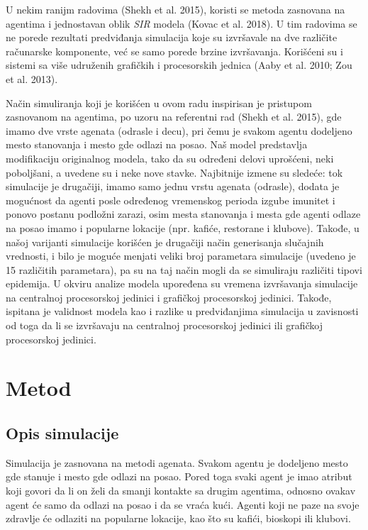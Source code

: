 U nekim ranijm radovima (Shekh et al. 2015), koristi se metoda zasnovana na
agentima i jednostavan oblik \textit{SIR} modela (Kovac et al. 2018). U tim radovima se ne porede
rezultati predviđanja simulacija koje su izvršavale na dve različite računarske
komponente, već se samo porede brzine izvršavanja. Korišćeni su i sistemi sa više
udruženih grafičkih i procesorskih jednica (Aaby et al. 2010; Zou et al. 2013).

Način simuliranja koji je korišćen u ovom radu inspirisan je pristupom
zasnovanom na agentima, po uzoru na referentni rad (Shekh et al. 2015), gde imamo dve
vrste agenata (odrasle i decu), pri čemu je svakom agentu dodeljeno mesto stanovanja i
mesto gde odlazi na posao. Naš model predstavlja modifikaciju originalnog modela,
tako da su određeni delovi uprošćeni, neki poboljšani, a uvedene su i neke nove stavke.
Najbitnije izmene su sledeće: tok simulacije je drugačiji, imamo samo jednu vrstu
agenata (odrasle), dodata je mogućnost da agenti posle određenog vremenskog
perioda izgube imunitet i ponovo postanu podložni zarazi, osim mesta stanovanja i
mesta gde agenti odlaze na posao imamo i popularne lokacije (npr. kafiće, restorane i
klubove). Takođe, u našoj varijanti simulacije korišćen je drugačiji način generisanja
slučajnih vrednosti, i bilo je moguće menjati veliki broj parametara simulacije (uvedeno
je 15 različitih parametara), pa su na taj način mogli da se simuliraju različiti tipovi
epidemija. U okviru analize modela upoređena su vremena izvršavanja simulacije na
centralnoj procesorskoj jedinici i grafičkoj procesorskoj jedinici. Takođe, ispitana je
validnost modela kao i razlike u predviđanjima simulacija u zavisnosti od toga da li se
izvršavaju na centralnoj procesorskoj jedinici ili grafičkoj procesorskoj jedinici.

\section{Metod}

\subsection{Opis simulacije}

Simulacija je zasnovana na metodi agenata. Svakom agentu je dodeljeno mesto
gde stanuje i mesto gde odlazi na posao. Pored toga svaki agent je imao atribut koji
govori da li on želi da smanji kontakte sa drugim agentima, odnosno ovakav agent će
samo da odlazi na posao i da se vraća kući. Agenti koji ne paze na svoje zdravlje će
odlaziti na popularne lokacije, kao što su kafići, bioskopi ili klubovi.


